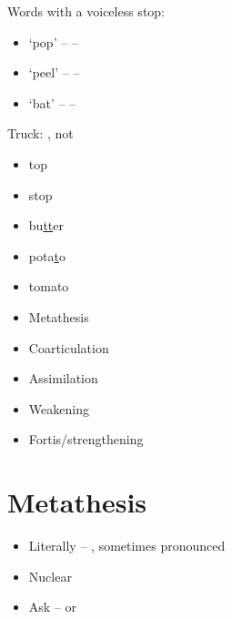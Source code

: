 \documentclass[title={}]{com310notes}
\begin{document}
\maketitle

Words with a voiceless stop:
\begin{itemize}
	\item `pop' --  -- 
	\item `peel' --  -- 
	\item `bat' --  -- \ipa{[b\ae{}t\textcorner]}
\end{itemize}

Truck: , not \ipa{[F2k]}

\begin{itemize}
	\item top \ipa{[t\super h{}ap]}
	\item stop \ipa{[stap]}
	\item bu\underline{tt}er \ipa{[b2R@\*r]}
	\item pota\underline{t}o 
	\item tomato 
\end{itemize}

\begin{itemize}
	\item Metathesis
	\item Coarticulation
	\item Assimilation
	\item Weakening
	\item Fortis/strengthening
\end{itemize}

\section{Metathesis}\label{sec:metathesis}
\begin{itemize}
	\item Literally -- \ipa{[l\'IR@rli]}, sometimes pronounced \ipa{[lItr\'@li]}
	\item Nuclear
	\item Ask -- \ipa{[\ae{}sk]} or \ipa{[\ae{}ks]}
\end{itemize}
\end{document}
